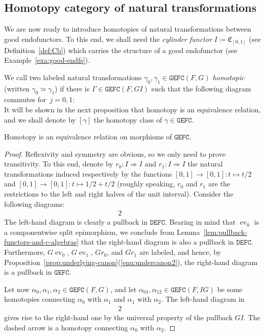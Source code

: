 \documentclass[10pt]{simplearticle}
\newcommand{\tikzinput}[1]{}
\newcommand{\ev}{\operatorname{ev}}
\newcommand{\GEFC}{\mathbb{\mathtt{GEFC}}}
\newcommand{\DEFC}{\mathbb{\mathtt{DEFC}}}
\newcommand{\C}{\mathfrak{C}^{\,}}
\begin{document}
\subsection{\label{subsec:homnattr}Homotopy category of natural transformations}

We
are now ready to introduce homotopies of natural
transformations between good endofunctors. To this end, we shall need
the \emph{cylinder functor} $I\coloneqq\C_{[0,1]}$ (see Definition~\ref{def:Cb})
which carries the structure of a good endofunctor (see Example~\ref{exa:good-endfs}).
\begin{defn}
We call two labeled natural transformations $\gamma_{0},\gamma_{1}\in\GEFC(F,G)$
\emph{homotopic} (written $\gamma_{0}\simeq\gamma_{1}$) if there
is $\Gamma\in\GEFC(F,GI)$ such that the following diagram commutes
for~$j=0,1$:
\[
\tikzinput{d224}
\]
It will be shown in the next proposition that homotopy is an equivalence
relation, and we shall denote by $[\gamma]$ the homotopy class of
$\gamma\in\GEFC$.
\end{defn}

\begin{thm}\label{thm:homot-eqrel}
Homotopy
is an equivalence
relation on morphisms of $\GEFC$.
\end{thm}

\begin{proof}
Reflexivity and symmetry are obvious, so we only need to prove transitivity.
To this end, denote by $r_{0}\colon I\Rightarrow I$ and $r_{1}\colon I\Rightarrow I$
the natural transformations induced respectively by the functions
$[0,1]\to[0,1]\colon t\mapsto t/2$ and $[0,1]\to[0,1]\colon t\mapsto1/2+t/2$
(roughly speaking, $r_{0}$ and $r_{1}$ are the restrictions to the
left and right halves of the unit interval). Consider the following
diagrams:
\begin{alignat}{2}
\tikzinput{d271} & \qquad & \tikzinput{d272}\label{eq:homot-eqrel}
\end{alignat}
The left-hand diagram is clearly a pullback in $\DEFC$. Bearing in
mind that $\ev_{0}$ is a componentwise split epimorphism, we conclude
from Lemma~\ref{lem:pullback-functors-and-c-algebras} that the right-hand
diagram is also a pullback in $\DEFC$. Furthermore, $G\ev_{0}$,
$G\ev_{1}$, $Gr_{0}$, and $Gr_{1}$ are labeled, and hence, by Proposition~\ref{prop:underlying-canon}(\ref{enu:undercanon2}),
the right-hand diagram is a pullback in $\GEFC$.

Let now $\alpha_{0},\alpha_{1},\alpha_{2}\in\GEFC(F,G)$, and let
$\alpha_{01},\alpha_{12}\in\GEFC(F,IG)$ be some homotopies connecting
$\alpha_{0}$ with $\alpha_{1}$ and $\alpha_{1}$ with $\alpha_{2}$.
The left-hand diagram in
\begin{alignat*}{2}
\tikzinput{d194} & \qquad & \tikzinput{d195}
\end{alignat*}
gives rise to the right-hand one by the universal property of the
pullback $GI$. The dashed arrow is a homotopy connecting $\alpha_{0}$
with $\alpha_{2}$.
\end{proof}
\end{document}
